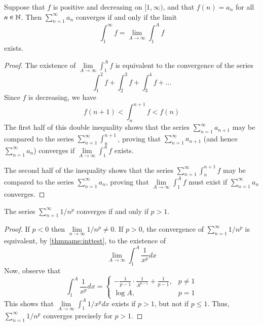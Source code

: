 \documentclass[12pt, a4paper, oneside, openright, titlepage]{book}
\begin{document}
\begin{namthm}\label{thmname:inttest}
    Suppose that $f$ is positive and decreasing on $[1,\infty)$, and that $f(n) = a_n$ for all $n \in \mathbb N$. Then $\sum\limits_{n=1}^{\infty}a_n$ converges if and only if the limit \begin{equation*}
        \int_1^{\infty}f = \lim\limits_{A\rightarrow \infty}\int_1^Af
    \end{equation*}
    exists.
\end{namthm}
\begin{proof}
    The existence of $\lim\limits_{A\rightarrow \infty}\int_1^Af$ is equivalent to the convergence of the series \begin{equation*}
        \int_1^2f + \int_2^3f + \int_3^4f + ...
    \end{equation*}
    Since $f$ is decreasing, we have \begin{equation*}
        f(n+1) < \int_n^{n+1}f < f(n) 
    \end{equation*}
    The first half of this double inequality shows that the series $\sum\limits_{n=1}^{\infty}a_{n+1}$ may be compared to the series $\sum\limits_{n=1}^{\infty}\int_n^{n+1}$, proving that $\sum\limits_{n=1}^{\infty}a_{n+1}$ (and hence $\sum\limits_{n=1}^{\infty}a_n$) converges if $\lim\limits_{A\rightarrow \infty}\int_1^Af$ exists.

    The second half of the inequality shows that the series $\sum\limits_{n=1}^{\infty}\int_n^{n+1}f$ may be compared to the series $\sum\limits_{n=1}^{\infty}a_n$, proving that $\lim\limits_{A\rightarrow \infty}\int_1^Af$ must exist if $\sum\limits_{n=1}^{\infty}a_n$ converges.
\end{proof}


\begin{cor}
    The series $\sum\limits_{n=1}^{\infty}1/n^p$ converges if and only if $p > 1$.
\end{cor}
\begin{proof}
    If $p < 0$ then $\lim\limits_{n\rightarrow \infty}1/n^p \neq 0$. If $p > 0$, the convergence of $\sum\limits_{n=1}^{\infty}1/n^p$ is equivalent, by \ref{thmname:inttest}, to the existence of \begin{equation*}
        \lim\limits_{A\rightarrow\infty}\int_1^A\frac{1}{x^p}dx
    \end{equation*}
    Now, observe that \begin{equation*}
        \int_1^A\frac{1}{x^p}dx = \left\{\begin{array}{lc} -\frac{1}{p-1}\cdot\frac{1}{A^{p-1}} + \frac{1}{p-1}, & p \neq 1 \\ \log A, & p = 1\end{array}\right.
    \end{equation*}
    This shows that $\lim\limits_{A\rightarrow \infty}\int_1^A1/x^pdx$ exists if $p > 1$, but not if $p \leq 1$. Thus, $\sum\limits_{n=1}^{\infty}1/n^p$ converges precisely for $p > 1$. 
\end{proof}
\end{document}
